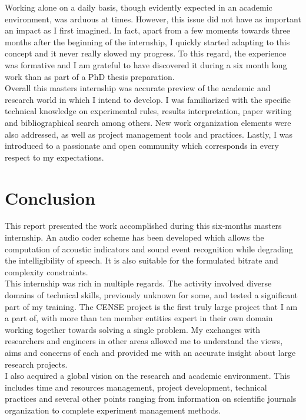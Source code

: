 \documentclass[12pt,times,onecolumn]{article}
\begin{document}
Working alone on a daily basis, though evidently expected in an academic environment, was arduous at times. However, this issue did not have as important an impact as I first imagined. In fact, apart from a few moments towards three months after the beginning of the internship, I quickly started adapting to this concept and it never really slowed my progress. To this regard, the experience was formative and I am grateful to have discovered it during a six month long work than as part of a PhD thesis preparation.\\

Overall this masters internship was accurate preview of the academic and research world in which I intend to develop. I was familiarized with the specific technical knowledge on experimental rules, results interpretation, paper writing and bibliographical search among others. New work organization elements were also addressed, as well as project management tools and practices. Lastly, I was introduced to a passionate and open community which corresponds in every respect to my expectations.\\


\clearpage
\section*{Conclusion}
This report presented the work accomplished during this six-months masters internship. An audio coder scheme has been developed which allows the computation of acoustic indicators and sound event recognition while degrading the intelligibility of speech. It is also suitable for the formulated bitrate and complexity constraints.\\


This internship was rich in multiple regards. The activity involved diverse domains of technical skills, previously unknown for some, and tested a significant part of my training. The CENSE project is the first truly large project that I am a part of, with more than ten member entities expert in their own domain working together towards solving a single problem. My exchanges with researchers and engineers in other areas allowed me to understand the views, aims and concerns of each and provided me with an accurate insight about large research projects.\\

I also acquired a global vision on the research and academic environment. This includes time and resources management, project development, technical practices and several other points ranging from information on scientific journals organization to complete experiment management methods.\\
\end{document}
